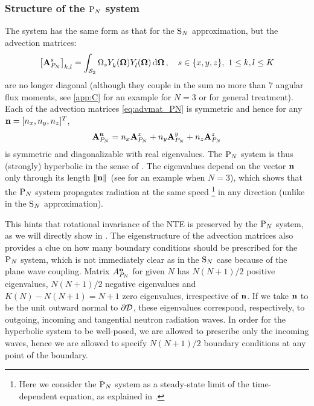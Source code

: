 \subsubsection{Structure of the $\text{P}_{N}$ system}
The system has the same form as that for the $\text{S}_{N}$ approximation, but the advection matrices:
\begin{equation}\label{eq:advmat_PN}
	\left[\mat{A}_{P_N}^s\right]_{k,l} = \intA{\Omega_s \Y{k}{}(\bomega)\Yc{l}{}(\bomega)},\quad s\in\{x,y,z\},\ 
	1 \leq k,l \leq  K
\end{equation}
are no longer diagonal (although they couple in the sum no more than 7 angular flux moments, see \ref{app:C} for an
example for $N = 3$ or \cite[App. A]{Sanchez8} for general treatment). Each of the advection matrices \eqref{eq:advmat_PN} 
is symmetric and hence for any $\mathbf{n} = [n_x,n_y,n_z]^T$, 
$$
	\mathbf{A}_{P_N}^{\mathbf{n}} = n_x \mathbf{A}_{P_N}^x + n_y \mathbf{A}_{P_N}^y + n_z \mathbf{A}_{P_N}^z
$$
is symmetric and diagonalizable with real eigenvalues. The $\text{P}_{N}$ system is thus (strongly) hyperbolic in the sense of 
\cite[Def. 18.1]{leveque}. The eigenvalues depend on the vector
$\mathbf{n}$ only through its length $\lVert \mathbf{n} \rVert_{}$ (see  for an example when $N = 3$), which shows that the $\text{P}_{N}$ 
system propagates radiation at the same speed \footnote{Here we
consider the $\text{P}_{N}$ system as a steady-state limit of the time-dependent equation, as explained in .} in any
direction (unlike in the $\text{S}_{N}$ approximation).

This hints that rotational invariance of the NTE is preserved by the $\text{P}_{N}$ system, as we will directly show in 
\sref{sec:dirinvPN}. The eigenstructure of the advection matrices also provides a clue on how many boundary conditions
should be prescribed for the $\text{P}_{N}$ system, which is not immediately clear as in the $\text{S}_{N}$ case because of the plane
wave coupling.
Matrix $A_{P_N}^{\mathbf{n}}$ for given $N$ has $N(N+1)/2$ positive eigenvalues, $N(N+1)/2$ negative eigenvalues and $K(N) - N(N+1) = N+1$ zero eigenvalues,
irrespective of $\mathbf{n}$. If we take $\mathbf{n}$ to be the unit outward normal to $\partial \mathcal{D}$, these eigenvalues correspond,
respectively, to outgoing, incoming and tangential neutron radiation waves. In order for the hyperbolic system to be
well-posed, we are allowed to prescribe only the incoming waves, hence we are allowed to specify $N(N+1)/2$ boundary
conditions at any point of the boundary. 

